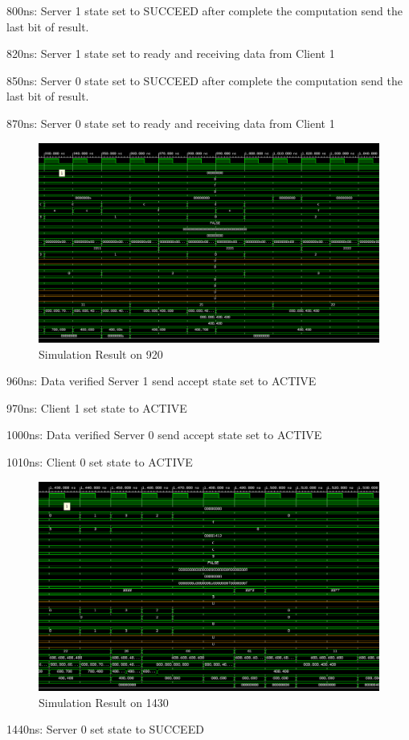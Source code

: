 \newpage
800ns:    Server 1 state set to SUCCEED after complete the computation send the last bit of result.

820ns:    Server 1 state set to ready and receiving data from Client 1

850ns:    Server 0 state set to SUCCEED after complete the computation send the last bit of result.

870ns:	  Server 0 state set to ready and receiving data from Client 1

\begin{figure}[htb]
	\centering
	\includegraphics[width=.7\linewidth]{figures/new-sim/sim920.png}
	\caption{Simulation Result on 920}
	\label{fig:sim920}
\end{figure}

\newpage
960ns:    Data verified Server 1 send accept state set to ACTIVE 

970ns:    Client 1 set state to ACTIVE

1000ns:   Data verified Server 0 send accept state set to ACTIVE

1010ns:   Client 0 set state to ACTIVE
\begin{figure}[htb]
	\centering
	\includegraphics[width=.7\linewidth]{figures/new-sim/sim-1430.png}
	\caption{Simulation Result on 1430}
	\label{fig:sim1430}
\end{figure}

\newpage
1440ns:   Server 0 set state to SUCCEED

